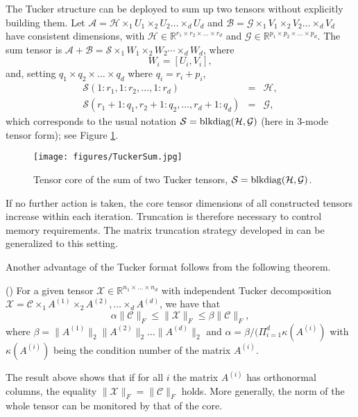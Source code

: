 \documentclass{siamart190516}
\newcommand{\cc}[1]{\mathcal{#1}}
\newcommand{\cA}{\cc A}
\newcommand{\cX}{\cc X}
\newcommand{\cG}{\cc G}
\newcommand{\cB}{\cc B}
\newcommand{\cS}{\cc S}
\newcommand{\RR}{\mathbb R}
\begin{document}
The Tucker structure can be deployed to sum up two tensors without explicitly building them. Let $\cA=\cc{H}\times_1 U_{1}\times_2 U_{2}\dots\times_d U_{d}$ and $\cB=\cG\times_1 V_{1}\times_2 V_{2}\dots \times_d V_{d}$ have consistent dimensions, 
with $\cc{H}\in\RR^{r_1\times r_2\times \dots\times r_d}$ and $\cG\in\RR^{p_1\times p_2\times \dots\times p_d}$.
The sum tensor is $\cA + \cB = \cS \times_1 W_1 \times_2 W_2 \cdots \times_d W_d$, where
\[
W_{i}=[U_{i}, V_{i}],
\]
and, setting $q_1\times q_2\times \dots \times q_d$ where $q_i = r_i + p_i$,
\begin{eqnarray*}
\cS(1:r_1,1:r_2,\ldots,1:r_d)&=&\cc{H} ,\\ 
\cS(r_1+1:q_1,r_2+1:q_2,\ldots,r_d+1:q_d)&=&\cG ,
\end{eqnarray*}
which corresponds to the usual notation 
$\cS={\rm blkdiag}(\cc{H},\cG)$ (here in 3-mode tensor form); 
see Figure \ref{fig:blockdiag}.

\begin{figure}[htb]\label{fig:blockdiag}
\centering
\texttt{[image: figures/TuckerSum.jpg]}
\caption{Tensor core of the sum of two Tucker tensors,
$\cS={\rm blkdiag}(\cc{H},\cG)$.}
\end{figure}

If no further action is taken, the core tensor dimensions of all constructed tensors increase within each iteration. Truncation is therefore necessary to control memory requirements. The matrix truncation strategy developed in
\cite{simoncini:hal-04437719}
can be generalized to this setting.

Another advantage of the Tucker format follows from the
following theorem.

\begin{theorem}{\rm (\cite{jiang2017tensor})}\label{th_tuck}
For a given tensor $\cX\in\RR^{n_1 \times \dots\times n_d}$ with independent Tucker decomposition $\cX= \cc{C}\times_1 A^{(1)}\times_2 A^{(2)},\ldots\times_d A^{(d)}$, we have that
\begin{equation}
    \alpha\|\cc{C}\|_F\le\|\cX\|_F\le\beta\|\cc{C}\|_F,
\end{equation}
where $\beta=\|A^{(1)}\|_2\|A^{(2)}\|_2\dots\|A^{(d)}\|_2$ and $\alpha=\beta/(\Pi_{i=1}^{d}\kappa(A^{(i)})$ with $\kappa(A^{(i)})$ being the condition number of the matrix $A^{(i)}$.
\end{theorem}
The result above shows that if for all $i$ the matrix $A^{(i)}$ has orthonormal columns, the equality $\|\cX\|_F=\|\cc{C}\|_F$ holds. More generally,
the norm of the whole tensor can be monitored by that of the core. %




\end{document}
